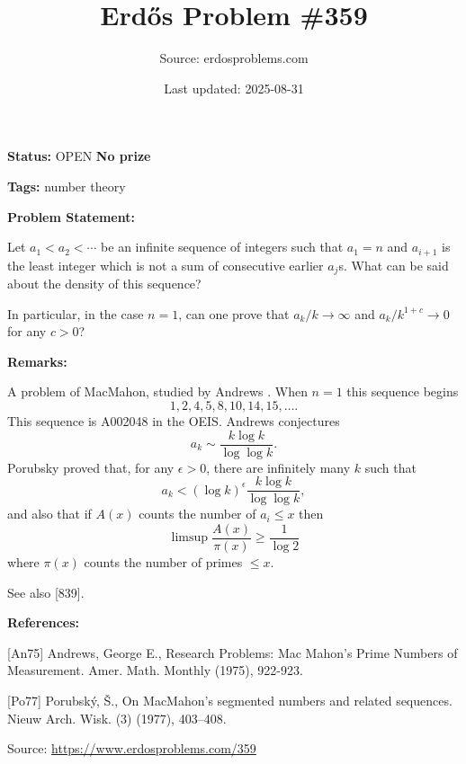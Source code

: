 \documentclass{article}
\title{Erd\H{o}s Problem \#359}
\date{Last updated: 2025-08-31}
\author{Source: erdosproblems.com}
\begin{document}
\maketitle

\noindent\textbf{Status:} OPEN \quad \textbf{No prize}

\noindent\textbf{Tags:} number theory

\medskip
\noindent\textbf{Problem Statement:}

Let $a_1<a_2<\cdots$ be an infinite sequence of integers such that $a_1=n$ and $a_{i+1}$ is the least integer which is not a sum of consecutive earlier $a_j$s. What can be said about the density of this sequence?

In particular, in the case $n=1$, can one prove that $a_k/k\to \infty$ and $a_k/k^{1+c}\to 0$ for any $c>0$?

\bigskip
\noindent\textbf{Remarks:}

A problem of MacMahon, studied by Andrews \cite{An75}. When $n=1$ this sequence begins\[1,2,4,5,8,10,14,15,\ldots.\]This sequence is A002048 in the OEIS. Andrews conjectures\[a_k\sim \frac{k\log k}{\log\log k}.\]Porubsky \cite{Po77} proved that, for any $\epsilon>0$, there are infinitely many $k$ such that\[a_k < (\log k)^\epsilon \frac{k\log k}{\log\log k},\]and also that if $A(x)$ counts the number of $a_i\leq x$ then\[\limsup \frac{A(x)}{\pi(x)}\geq \frac{1}{\log 2}\]where $\pi(x)$ counts the number of primes $\leq x$.

See also [839].

\bigskip
\noindent\textbf{References:}

[An75] Andrews, George E., Research Problems: Mac Mahon's Prime Numbers of Measurement. Amer. Math. Monthly (1975), 922-923.
 
 [Po77] Porubsk\'y, \v S., On {M}ac{M}ahon's segmented numbers and related sequences. Nieuw Arch. Wisk. (3) (1977), 403--408.

\bigskip
\noindent\small{Source: \url{https://www.erdosproblems.com/359}}
\end{document}
